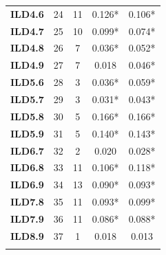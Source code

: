 \begin{table}[!h]
\begin{center}
\begin{tabular}{>{\bfseries}lccS[table-format=1.4]S[table-format=1.4]}
ILD4.6 & 24 & 11 & 0.126* & 0.106*\\
ILD4.7 & 25 & 10 & 0.099* & 0.074*\\
ILD4.8 & 26 & 7 & 0.036* & 0.052*\\
ILD4.9 & 27 & 7 & 0.018 & 0.046*\\
ILD5.6 & 28 & 3 & 0.036* & 0.059*\\
ILD5.7 & 29 & 3 & 0.031* & 0.043*\\
ILD5.8 & 30 & 5 & 0.166* & 0.166*\\
ILD5.9 & 31 & 5 & 0.140* & 0.143*\\
ILD6.7 & 32 & 2 & 0.020 & 0.028*\\
ILD6.8 & 33 & 11 & 0.106* & 0.118*\\
ILD6.9 & 34 & 13 & 0.090* & 0.093*\\
ILD7.8 & 35 & 11 & 0.093* & 0.099*\\
ILD7.9 & 36 & 11 & 0.086* & 0.088*\\
ILD8.9 & 37 & 1 & 0.018 & 0.013\\*
\bottomrule
{}\\
\end{tabular}
\end{center}
\label{tab:CovTest}
\end{table}
\vspace{-35pt}

\FloatBarrier

